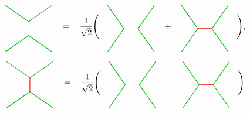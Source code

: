 \documentclass[report,paper=a4, fontsize=12pt, line_length=16cm, number_of_lines=33,dvipdfmx]{jlreq}
\numberwithin{equation}{chapter}
\begin{document}
\begin{align}
    \begin{tikzpicture}[baseline=0]
        \coordinate(A) at (-1,-1);
        \coordinate(B) at (1,-1);
        \coordinate(C) at (1,1);
        \coordinate(D) at (-1,1);
        \draw[darkgreen,thick] (D)--(0,0.3)--(C);
        \draw[darkgreen,thick] (A)--(0,-0.3)--(B);
    \end{tikzpicture}
    \quad=\quad \frac{1}{\sqrt{2}}\Bigg(
    \quad
    \begin{tikzpicture}[baseline=0]
        \coordinate(A) at (-1,-1);
        \coordinate(B) at (1,-1);
        \coordinate(C) at (1,1);
        \coordinate(D) at (-1,1);
        \draw[darkgreen,thick] (D)--(-0.3,0)--(A);
        \draw[darkgreen,thick] (C)--(0.3,0)--(B);
    \end{tikzpicture}
    \quad
    +
    \quad
    \begin{tikzpicture}[baseline=0]
        \coordinate(A) at (-1,-1);
        \coordinate(B) at (1,-1);
        \coordinate(C) at (1,1);
        \coordinate(D) at (-1,1);
        \draw[darkgreen,thick] (D)--(-0.3,0)--(A);
        \draw[darkgreen,thick] (C)--(0.3,0)--(B);
        \draw[red,thick] (0.3,0)--(-0.3,0);
    \end{tikzpicture}
    \quad
    \Bigg),
\end{align}

\begin{align}
    \begin{tikzpicture}[baseline=0]
        \coordinate(A) at (-1,-1);
        \coordinate(B) at (1,-1);
        \coordinate(C) at (1,1);
        \coordinate(D) at (-1,1);
        \draw[darkgreen,thick] (D)--(0,0.3)--(C);
        \draw[darkgreen,thick] (A)--(0,-0.3)--(B);
        \draw[red,thick] (0,0.3)--(0,-0.3);
    \end{tikzpicture}
    \quad=\quad \frac{1}{\sqrt{2}}\Bigg(
    \quad
    \begin{tikzpicture}[baseline=0]
        \coordinate(A) at (-1,-1);
        \coordinate(B) at (1,-1);
        \coordinate(C) at (1,1);
        \coordinate(D) at (-1,1);
        \draw[darkgreen,thick] (D)--(-0.3,0)--(A);
        \draw[darkgreen,thick] (C)--(0.3,0)--(B);
    \end{tikzpicture}
    \quad
    -
    \quad
    \begin{tikzpicture}[baseline=0]
        \coordinate(A) at (-1,-1);
        \coordinate(B) at (1,-1);
        \coordinate(C) at (1,1);
        \coordinate(D) at (-1,1);
        \draw[darkgreen,thick] (D)--(-0.3,0)--(A);
        \draw[darkgreen,thick] (C)--(0.3,0)--(B);
        \draw[red,thick] (0.3,0)--(-0.3,0);
    \end{tikzpicture}
    \quad
    \Bigg)
\end{align}
\end{document}
